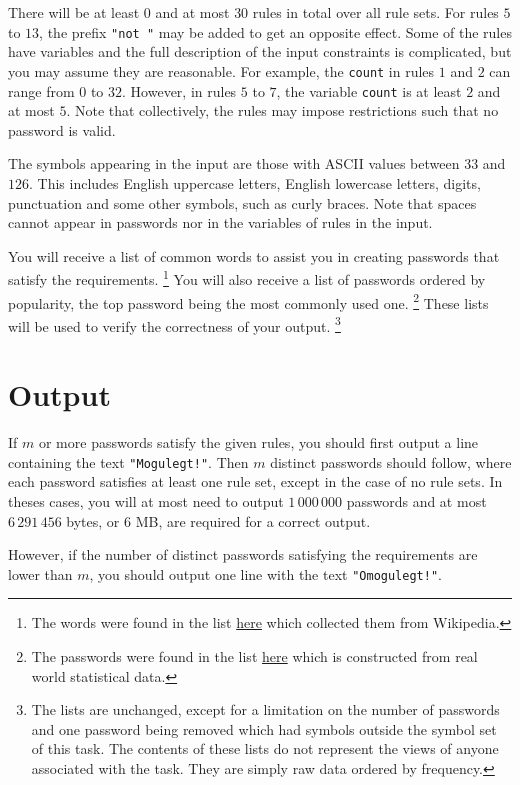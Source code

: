 There will be at least $0$ and at most $30$ rules in total over all rule sets.
For rules $5$ to $13$, the prefix \texttt{"not "} may be added to get an opposite effect.
Some of the rules have variables and the full description of the input constraints is complicated, but you may assume they are reasonable.
For example, the \texttt{count} in rules $1$ and $2$ can range from $0$ to $32$.
However, in rules $5$ to $7$, the variable \texttt{count} is at least $2$ and at most $5$.
Note that collectively, the rules may impose restrictions such that no password is valid.

The symbols appearing in the input are those with ASCII values between $33$ and $126$.
This includes English uppercase letters, English lowercase letters, digits, punctuation and some other symbols, such as curly braces.
Note that spaces cannot appear in passwords nor in the variables of rules in the input.

You will receive a list of common words to assist you in creating passwords that satisfy the requirements.
\footnote{The words were found in the list \href{https://github.com/tkoop/popular-english-words/}{here} which collected them from Wikipedia.}
You will also receive a list of passwords ordered by popularity, the top password being the most commonly used one.
\footnote{The passwords were found in the list \href{https://github.com/danielmiessler/SecLists/tree/master/Passwords/Common-Credentials}{here} which is constructed from real world statistical data.}
These lists will be used to verify the correctness of your output.
\footnote{The lists are unchanged, except for a limitation on the number of passwords and one password being removed which had symbols outside the symbol set of this task.
The contents of these lists do not represent the views of anyone associated with the task.
They are simply raw data ordered by frequency.}


\section*{Output}
If $m$ or more passwords satisfy the given rules, you should first output a line containing the text \texttt{"Mogulegt!"}.
Then $m$ distinct passwords should follow, where each password satisfies at least one rule set, except in the case of no rule sets.
In theses cases, you will at most need to output $1\,000\,000$ passwords and at most $6\,291\,456$ bytes, or $6$ MB, are required for a correct output.

However, if the number of distinct passwords satisfying the requirements are lower than $m$,
you should output one line with the text \texttt{"Omogulegt!"}.


